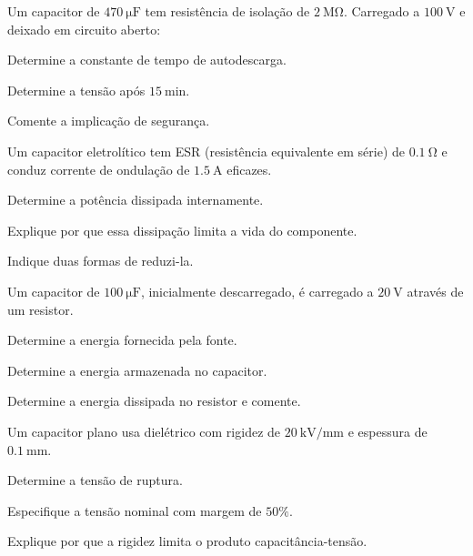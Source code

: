 \begin{questao}[3]{}

Um capacitor de $\SI{470}{\micro\farad}$ tem resistência de isolação de
$\SI{2}{\mega\ohm}$. Carregado a $\SI{100}{\volt}$ e deixado em circuito
aberto:
\begin{itensq}
\item Determine a constante de tempo de autodescarga.
\item Determine a tensão após $\SI{15}{\minute}$.
\item Comente a implicação de segurança.
\end{itensq}


\end{questao}
\begin{questao}[3]{}

Um capacitor eletrolítico tem ESR (resistência equivalente em série) de
$\SI{0.1}{\ohm}$ e conduz corrente de ondulação de
$\SI{1.5}{\ampere}$ eficazes.
\begin{itensq}
\item Determine a potência dissipada internamente.
\item Explique por que essa dissipação limita a vida do componente.
\item Indique duas formas de reduzi-la.
\end{itensq}


\end{questao}
\begin{questao}[3]{}

Um capacitor de $\SI{100}{\micro\farad}$, inicialmente descarregado, é
carregado a $\SI{20}{\volt}$ através de um resistor.
\begin{itensq}
\item Determine a energia fornecida pela fonte.
\item Determine a energia armazenada no capacitor.
\item Determine a energia dissipada no resistor e comente.
\end{itensq}


\end{questao}
\begin{questao}[3]{}

Um capacitor plano usa dielétrico com rigidez de
$\SI{20}{\kilo\volt\per\milli\meter}$ e espessura de
$\SI{0.1}{\milli\meter}$.
\begin{itensq}
\item Determine a tensão de ruptura.
\item Especifique a tensão nominal com margem de $50\%$.
\item Explique por que a rigidez limita o produto capacitância-tensão.
\end{itensq}


\end{questao}
